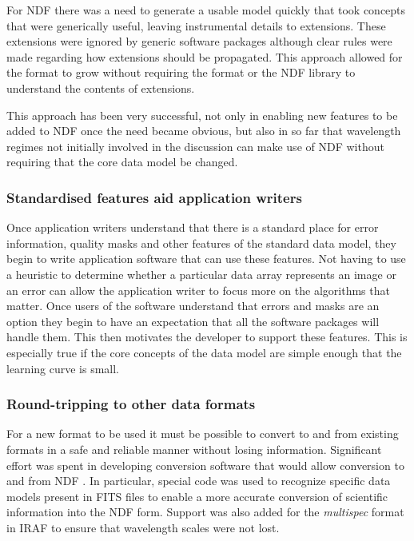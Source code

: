 \documentclass[final,authoryear,5p,times,twocolumn]{elsarticle}
\begin{document}
For NDF there was a need to generate a usable model quickly that took
concepts that were generically useful, leaving instrumental details to
extensions. These extensions were ignored by generic software packages
although clear rules were made regarding how extensions should be
propagated. This approach allowed for the format to grow without
requiring the format or the NDF library to understand the
contents of extensions.

This approach has been very successful, not only in enabling new
features to be added to NDF once the need became obvious, but also
in so far that wavelength regimes not initially involved in the
discussion can make use of NDF without requiring that the core data
model be changed.

\subsubsection{Standardised features aid application writers}

Once application writers understand that there is a standard place for
error information, quality masks and other features of the standard
data model, they begin to write application software that can use
these features. Not having to use a heuristic to determine whether a
particular data array represents an image or an error can allow the
application writer to focus more on the algorithms that matter. Once
users of the software understand that errors and masks are an option
they begin to have an expectation that all the software packages will
handle them. This then motivates the developer to support these
features.  This is especially true if the core concepts of the data
model are simple enough that the learning curve is small.

\subsubsection{Round-tripping to other data formats}

For a new format to be used it must be possible to
convert to and from existing formats in a safe and reliable manner
without losing information.
Significant effort was spent in developing conversion software that
would allow conversion to and from NDF
\citep{SUN55,1997STARB..19...14C}. In particular, special code was
used to recognize specific data models present in FITS files to enable
a more accurate conversion of scientific information into the NDF
form. Support was also added for the \emph{multispec} format in IRAF
\citep{1993ASPC...52..467V} to ensure that wavelength scales were not
lost.
\end{document}
